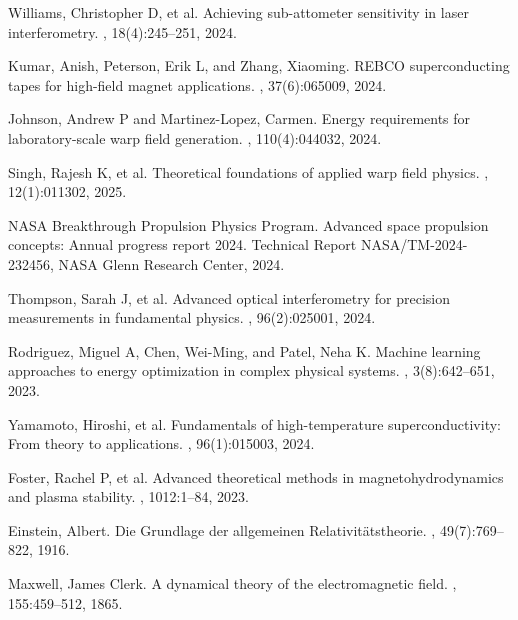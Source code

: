 \documentclass[12pt,a4paper]{article}
\begin{document}
\begin{thebibliography}{99}
Williams, Christopher D, et al.
\newblock Achieving sub-attometer sensitivity in laser interferometry.
, 18(4):245--251, 2024.

Kumar, Anish, Peterson, Erik L, and Zhang, Xiaoming.
\newblock REBCO superconducting tapes for high-field magnet applications.
, 37(6):065009, 2024.

Johnson, Andrew P and Martinez-Lopez, Carmen.
\newblock Energy requirements for laboratory-scale warp field generation.
, 110(4):044032, 2024.

Singh, Rajesh K, et al.
\newblock Theoretical foundations of applied warp field physics.
, 12(1):011302, 2025.

NASA Breakthrough Propulsion Physics Program.
\newblock Advanced space propulsion concepts: Annual progress report 2024.
\newblock Technical Report NASA/TM-2024-232456, NASA Glenn Research Center, 2024.

Thompson, Sarah J, et al.
\newblock Advanced optical interferometry for precision measurements in fundamental physics.
, 96(2):025001, 2024.

Rodriguez, Miguel A, Chen, Wei-Ming, and Patel, Neha K.
\newblock Machine learning approaches to energy optimization in complex physical systems.
, 3(8):642--651, 2023.

Yamamoto, Hiroshi, et al.
\newblock Fundamentals of high-temperature superconductivity: From theory to applications.
, 96(1):015003, 2024.

Foster, Rachel P, et al.
\newblock Advanced theoretical methods in magnetohydrodynamics and plasma stability.
, 1012:1--84, 2023.

Einstein, Albert.
\newblock Die Grundlage der allgemeinen Relativitätstheorie.
, 49(7):769--822, 1916.

Maxwell, James Clerk.
\newblock A dynamical theory of the electromagnetic field.
, 155:459--512, 1865.


\end{thebibliography}
\end{document}
